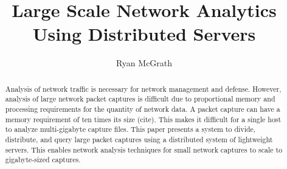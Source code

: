 \documentclass{article}
\begin{document}
\title{Large Scale Network Analytics Using Distributed Servers}
\author{Ryan McGrath}
\maketitle

\begin{abstract}

  Analysis of network traffic is necessary for network management and defense. However, analysis of large network packet captures is difficult due to proportional memory and processing requirements for the quantity of network data. A packet capture can have a memory requirement of ten times its size (cite). This makes it difficult for a single host to analyze multi-gigabyte capture files.  This paper presents a system to divide, distribute, and query large packet captures using a distributed system of lightweight servers. This enables network analysis techniques for small network captures to scale to gigabyte-sized captures.


\end{abstract}
\end{document}
